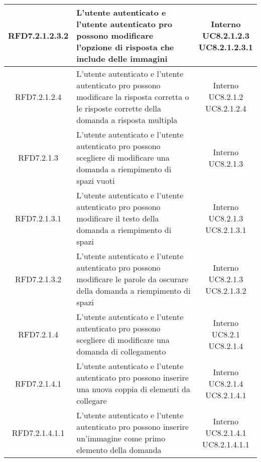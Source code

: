 \begin{longtable}{|c|>{\centering}m{7cm}|c|}
			 \hypertarget{{RFD7.2.1.2.3.2}}{{RFD7.2.1.2.3.2}} & L’utente autenticato e l'utente autenticato pro possono modificare l’opzione di risposta che include delle immagini & \makecell{Interno\\ UC8.2.1.2.3 \\UC8.2.1.2.3.1 } \\ \hline
			 \hypertarget{{RFD7.2.1.2.4}}{{RFD7.2.1.2.4}} & L’utente autenticato e l’utente autenticato pro possono modificare la risposta corretta o le risposte corrette della domanda a risposta multipla & \makecell{Interno\\ UC8.2.1.2 \\UC8.2.1.2.4 } \\ \hline
			 \hypertarget{{RFD7.2.1.3}}{{RFD7.2.1.3}} & L’utente autenticato e l’utente autenticato pro possono scegliere di modificare una domanda a riempimento di spazi vuoti & \makecell{Interno\\ UC8.2.1.3 } \\ \hline
			 \hypertarget{{RFD7.2.1.3.1}}{{RFD7.2.1.3.1}} & L’utente autenticato e l'utente autenticato pro possono modificare il testo della domanda a riempimento di spazi & \makecell{Interno\\ UC8.2.1.3 \\UC8.2.1.3.1 } \\ \hline
			 \hypertarget{{RFD7.2.1.3.2}}{{RFD7.2.1.3.2}} & L’utente autenticato e l'utente autenticato pro possono modificare le parole da oscurare della domanda a riempimento di spazi  & \makecell{Interno\\ UC8.2.1.3 \\UC8.2.1.3.2 } \\ \hline
			 \hypertarget{{RFD7.2.1.4}}{{RFD7.2.1.4}} & L’utente autenticato e l’utente autenticato pro possono scegliere di modificare una domanda di collegamento & \makecell{Interno\\ UC8.2.1 \\UC8.2.1.4 } \\ \hline
			 \hypertarget{{RFD7.2.1.4.1}}{{RFD7.2.1.4.1}} & L’utente autenticato e l'utente autenticato pro possono inserire una nuova coppia di elementi da collegare & \makecell{Interno\\ UC8.2.1.4 \\UC8.2.1.4.1 } \\ \hline
			 \hypertarget{{RFD7.2.1.4.1.1}}{{RFD7.2.1.4.1.1}} & L’utente autenticato e l'utente autenticato pro possono inserire un’immagine come primo elemento della domanda & \makecell{Interno\\ UC8.2.1.4.1 \\UC8.2.1.4.1.1 } \\ \hline

\end{longtable}
